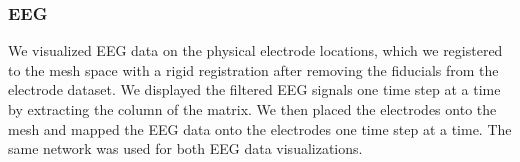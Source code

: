 \subsubsection{EEG}

We visualized EEG data on the physical electrode locations, which we registered to the mesh space with a rigid registration after removing the fiducials from the electrode dataset. We displayed the filtered EEG signals one time step at a time by extracting the column of the matrix. We then placed the electrodes onto the mesh and mapped the EEG data onto the electrodes one time step at a time. The same network was used for both EEG data visualizations.

